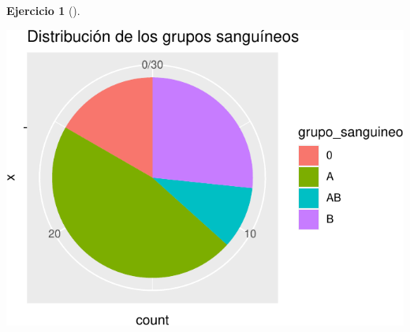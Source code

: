 \documentclass[
  a4paper,
]{scrreport}
\theoremstyle{definition}
\newtheorem{exercise}{Ejercicio}[chapter]
\theoremstyle{remark}
\begin{document}
\begin{exercise}[]
\begin{enumerate}
\begin{tcolorbox}
  \includegraphics{03-frecuencias-graficos_files/figure-pdf/unnamed-chunk-27-1.pdf}

  \end{tcolorbox}
\end{enumerate}

\end{exercise}
\end{document}
